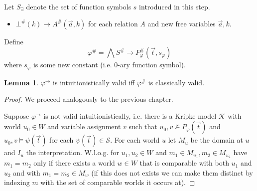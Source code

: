 \documentclass[a4paper,12pt]{report}
\theoremstyle{definition}
\theoremstyle{definition}
\theoremstyle{definition}
\newtheorem{lemma}[theorem]{Lemma}
\theoremstyle{definition}
\theoremstyle{definition}
\theoremstyle{definition}
\theoremstyle{definition}
\begin{document}
		Let $S_\exists$ denote the set of function symbols $s$ introduced in this step.
	\begin{itemize}
		\item $\bot^\#(k)\to A^\#(\vec a, k)$ for each relation $A$ and new free variables $\vec a, k$.
	\end{itemize}
	Define $$\varphi^\# = \bigwedge S^\#\to P_\varphi^\#(\vec t, s_\varphi)$$ where $s_\varphi$ is some new constant (i.e. $0$-ary function symbol).
	\begin{lemma}
		$\varphi^\to$ is intuitionistically valid iff $\varphi^\#$ is classically valid.
	\end{lemma}

	\begin{proof}
		We proceed analogously to the previous chapter.
		
		Suppose $\varphi^\to$ is not valid intuitionistically, i.e. there is a Kripke model $\mathcal K$ with world $u_0\in W$ and variable assignment $v$ such that $u_0, v\not\models P_\varphi(\vec t)$ and $u_0, v\models \psi(\vec t)$ for each $\psi(\vec t)\in\mathcal{S}$. For each world $u$ let $M_{u}$ be the domain at $u$ and $I_u$ the interpretation.
		W.l.o.g. for $u_1, u_2\in W$ and $m_1\in M_{u_1}, m_2\in M_{u_2}$ have $m_1 = m_2$ only if there exists a world $w\in W$ that is comparable with both $u_1$ and $u_2$ and with $m_1 = m_2\in M_w$ (if this does not exists we can make them distinct by indexing $m$ with the set of comparable worlds it occurs at).
		

\end{proof}
\end{document}
